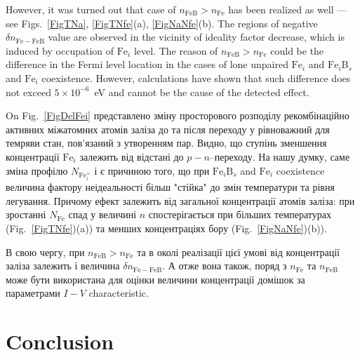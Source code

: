 \documentclass[12pt]{article}
\begin{document}
However, it was turned out that case of $n_\mathrm{FeB}>n_\mathrm{Fe}$ has been realized as well --- see Figs.~\ref{FigTNa}, \ref{FigTNfe}(a), \ref{FigNaNfe}(b).
The regions of negative $\delta n_\mathrm{Fe-FeB}$ value are observed in the vicinity of ideality factor decrease, 
which is induced by occupation of $\mathrm{Fe}_i$ level.
The reason  of $n_\mathrm{FeB}>n_\mathrm{Fe}$ could be the difference in the Fermi level location 
in the cases of lone unpaired $\mathrm{Fe}_i$ and $\mathrm{Fe}_i\mathrm{B}_s$ and $\mathrm{Fe}_i$ coexistence.
However, calculations have shown that such difference does not exceed $5\times10^{-6}$~eV and
cannot be the cause of the detected effect.


%

On Fig.~\ref{FigDelFei} представлено зміну просторового розподілу рекомбінаційно активних міжатомних
атомів заліза до та після переходу у рівноважний для темряви стан, пов'язаний
з утворенням пар.
Видно, що
ступінь зменшення концентрації $\mathrm{Fe}_i$ залежить від відстані до $p-n$--переходу.
На нашу думку, саме зміна профілю $N_{\mathrm{Fe}_i^+}$ і є причиною того, що при
$\mathrm{Fe}_i\mathrm{B}_s$ and $\mathrm{Fe}_i$ coexistence
величина фактору неідеальності більш "стійка" до змін температури та рівня легування.
Причому ефект залежить від загальної концентрації атомів заліза: при зростанні $N_{\mathrm{Fe}}$
спад у величині $n$ спостерігається при більших температурах (Fig.~\ref{FigTNfe})(a)) та менших
концентраціях бору (Fig.~\ref{FigNaNfe})(b)).

В свою чергу, при $n_\mathrm{FeB}>n_\mathrm{Fe}$ та в околі реалізації цієї умові від концентрації
заліза залежить і величина $\delta n_\mathrm{Fe-FeB}$.
А отже вона також, поряд з $n_\mathrm{Fe}$ та $n_\mathrm{FeB}$ може бути використана
для оцінки величини концентрації домішок за параметрами $I-V$ characteristic.

\section{Conclusion}
\end{document}
